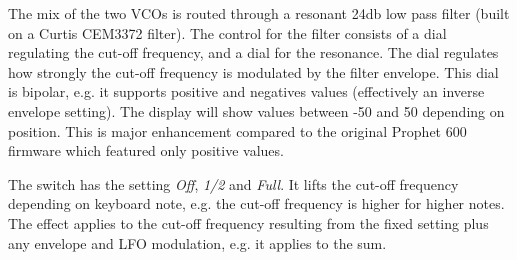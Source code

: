 The mix of the two VCOs is routed through a resonant 24db low pass filter (built on a Curtis CEM3372 filter). The control for the filter consists of a \filtercutoff dial regulating the cut-off frequency, and a \filterres dial for the resonance. The \filterenv dial regulates how strongly the cut-off frequency is modulated by the filter envelope. This dial is bipolar, e.g. it supports positive and negatives values (effectively an inverse envelope setting). The display will show values between -50 and 50 depending on position. This is major enhancement compared to the original Prophet 600 firmware which  featured only positive values.

\begin{center}
\end{center}

The \keyboardtrack switch has the setting \textit{Off}, \textit{1/2} and \textit{Full}. It lifts the cut-off frequency depending on keyboard note, e.g. the cut-off frequency is higher for higher notes. The effect applies to the cut-off frequency resulting from the fixed \filtercutoff setting plus any envelope and LFO modulation, e.g. it applies to the sum.  

